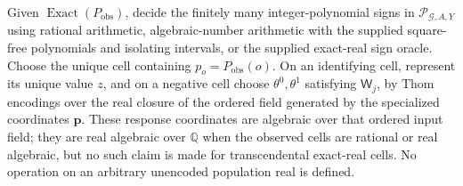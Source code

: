 Given \(\operatorname{Exact}(P_{\mathrm{obs}})\), decide the finitely many integer-polynomial signs in \(\mathscr P_{\mathcal G,A,Y}\) using rational arithmetic, algebraic-number arithmetic with the supplied square-free polynomials and isolating intervals, or the supplied exact-real sign oracle. Choose the unique cell containing \(p_o=P_{\mathrm{obs}}(o)\). On an identifying cell, represent its unique value \(z\), and on a negative cell choose \(\theta^0,\theta^1\) satisfying \(\mathsf W_j\), by Thom encodings over the real closure of the ordered field generated by the specialized coordinates \(\mathbf p\). These response coordinates are algebraic over that ordered input field; they are real algebraic over \(\mathbb Q\) when the observed cells are rational or real algebraic, but no such claim is made for transcendental exact-real cells. No operation on an arbitrary unencoded population real is defined.